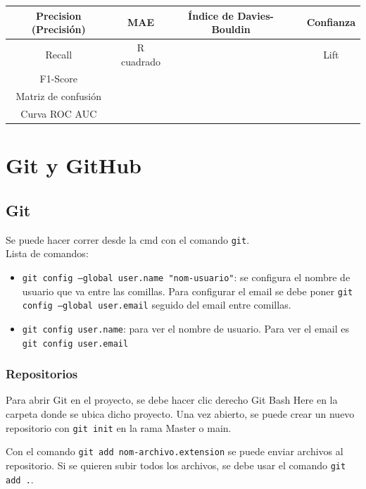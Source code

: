 \documentclass[a4paper, 12pt]{book}
\begin{document}
\begin{table}[H]
{\begin{tabular}{|ccccc|}
		\multicolumn{1}{|c|}{Precision (Precisión)} & \multicolumn{1}{c|}{MAE} & \multicolumn{1}{c|}{Índice de Davies-Bouldin} & \multicolumn{1}{c|}{} & Confianza \\ \hline
		\multicolumn{1}{|c|}{Recall} & \multicolumn{1}{c|}{R cuadrado} & \multicolumn{1}{c|}{} & \multicolumn{1}{c|}{} & Lift \\ \hline
		\multicolumn{1}{|c|}{F1-Score} & \multicolumn{1}{c|}{} & \multicolumn{1}{c|}{} & \multicolumn{1}{c|}{} &  \\ \hline
		\multicolumn{1}{|c|}{Matriz de confusión} & \multicolumn{1}{c|}{} & \multicolumn{1}{c|}{} & \multicolumn{1}{c|}{} &  \\ \hline
		\multicolumn{1}{|c|}{Curva ROC AUC} & \multicolumn{1}{c|}{} & \multicolumn{1}{c|}{} & \multicolumn{1}{c|}{} &  \\ \hline
	\end{tabular}
	}
\end{table}

%
\chapter{Git y GitHub}
\section{Git}
Se puede hacer correr desde la cmd con el comando \texttt{git}. \\
Lista de comandos:
\begin{itemize}
\item \texttt{git config --global user.name "nom-usuario"}: se configura el nombre de usuario que va entre las comillas. Para configurar el email se debe poner \texttt{git config --global user.email} seguido del email entre comillas.
\item \texttt{git config user.name}: para ver el nombre de usuario. Para ver el email es \texttt{git config user.email}
\end{itemize}
\subsection{Repositorios}
Para abrir Git en el proyecto, se debe hacer clic derecho Git Bash Here en la carpeta donde se ubica dicho proyecto. Una vez abierto, se puede crear un nuevo repositorio con \texttt{git init} en la rama Master o main.

Con el comando \texttt{git add nom-archivo.extension} se puede enviar archivos al repositorio. Si se quieren subir todos los archivos, se debe usar el comando \texttt{git add .}.
\end{document}
